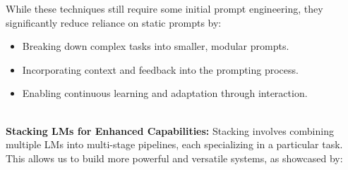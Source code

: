 While these techniques still require some initial prompt engineering, they significantly reduce reliance on static prompts by:
\begin{itemize}
    \item Breaking down complex tasks into smaller, modular prompts.
    \item Incorporating context and feedback into the prompting process.
    \item Enabling continuous learning and adaptation through interaction.
\end{itemize}
\\
\textbf{Stacking LMs for Enhanced Capabilities:} Stacking involves combining multiple LMs into multi-stage pipelines, each specializing in a particular task. This allows us to build more powerful and versatile systems, as showcased by:

